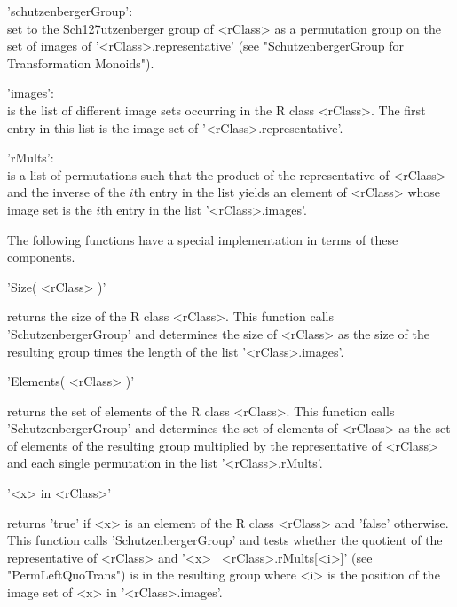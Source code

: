 'schutzenbergerGroup':\\
        set to   the Sch\accent127utzenberger group     of <rClass> as  a
        permutation      group  on       the  set     of    images     of
        '<rClass>.representative'    (see   "SchutzenbergerGroup      for
        Transformation Monoids").
        
'images':\\        
        is the  list  of different  image  sets occurring in the  R class
        <rClass>.  The first entry   in this list  is  the image set   of
        '<rClass>.representative'.
        
'rMults':\\        
        is a  list  of  permutations  such  that    the product  of   the
        representative of <rClass> and the  inverse of the $i$th entry in
        the list yields  an element  of <rClass> whose  image  set is the
        $i$th entry in the list '<rClass>.images'.

The  following functions have a  special implementation in terms of these
components.

\vspace{5mm}
'Size( <rClass> )'%

returns    the size  of  the   R  class  <rClass>.   This  function calls
'SchutzenbergerGroup' and determines the size of <rClass>  as the size of
the resulting group times the length of the list '<rClass>.images'.

\vspace{5mm}
'Elements( <rClass> )'%

returns the set of elements of the R class <rClass>.  This function calls
'SchutzenbergerGroup' and determines the  set of elements of  <rClass> as
the  set   of    elements of  the  resulting    group   multiplied by the
representative of   <rClass> and each   single   permutation in the  list
'<rClass>.rMults'.

\vspace{5mm}
'<x> in <rClass>'%
%

returns 'true' if <x>  is an element of the  R class <rClass> and 'false'
otherwise.  This function calls  'SchutzenbergerGroup' and tests  whether
the  quotient   of   the  representative    of  <rClass>  and   '<x>  \*\ 
<rClass>.rMults[<i>]' (see  "PermLeftQuoTrans") is in the resulting group
where <i> is the position of the image set of <x> in '<rClass>.images'.


